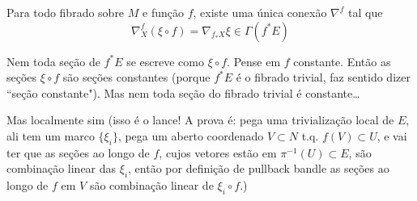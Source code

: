 \begin{prop}\leavevmode
Para todo fibrado sobre \(M\) e função \(f\), existe uma única conexão \(\nabla^f\) tal que
\[\nabla_X^f(\xi \circ f)=\nabla_{f_*X}\xi \in \Gamma(f^*E)\]

\end{prop}
\begin{remark}\leavevmode
Nem toda seção de \(f^*E\) se escreve como \(\xi \circ f\). Pense em \(f\) constante. Então as seções \(\xi \circ f\) são seções constantes (porque \(f^*E\) é o fibrado trivial, faz sentido dizer ``seção constante"). Mas nem toda seção do fibrado trivial é constante…

Mas localmente sim {\color{2}(isso é o lance! A prova é: pega uma trivialização local de \(E\), ali tem um marco \(\{\xi_i\}\), pega um aberto coordenado \(V \subset N\) t.q. \(f(V)\subset U\), e vai ter que as seções ao longo de \(f\), cujos vetores estão em \(\pi^{-1}(U)\subset E\), são combinação linear das \(\xi_i\), então por definição de pullback bandle as seções ao longo de \(f\) em \(V\) são combinação linear de \(\xi_i \circ f\).)}
\end{remark}

